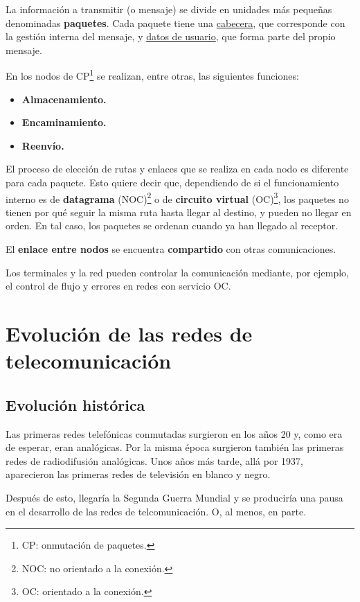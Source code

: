 \documentclass[a4paper]{book}
\begin{document}
La información a transmitir (o mensaje) se divide en unidades más pequeñas denominadas \textbf{paquetes}. Cada paquete tiene una \underline{cabecera}, que corresponde con la gestión interna del mensaje, y \underline{datos de usuario}, que forma parte del propio mensaje.

En los nodos de CP\footnote{CP: onmutación de paquetes.} se realizan, entre otras, las siguientes funciones:
\begin{itemize}
  \item \textbf{Almacenamiento.}
  \item \textbf{Encaminamiento.}
  \item \textbf{Reenvío.}
\end{itemize}

El proceso de elección de rutas y enlaces que se realiza en cada nodo es diferente para cada paquete. Esto quiere decir que, dependiendo de si el funcionamiento interno es de \textbf{datagrama} (NOC)\footnote{NOC: no orientado a la conexión.} o de \textbf{circuito virtual} (OC)\footnote{OC: orientado a la conexión.}, los paquetes no tienen por qué seguir la misma ruta hasta llegar al destino, y pueden no llegar en orden. En tal caso, los paquetes se ordenan cuando ya han llegado al receptor.

El \textbf{enlace entre nodos} se encuentra \textbf{compartido} con otras comunicaciones.

Los terminales y la red pueden controlar la comunicación mediante, por ejemplo, el control de flujo y errores en redes con servicio OC.



\section{Evolución de las redes de telecomunicación}

\subsection{Evolución histórica}
Las primeras redes telefónicas conmutadas surgieron en los años 20 y, como era de esperar, eran analógicas. Por la misma época surgieron también las primeras redes de radiodifusión analógicas. Unos años más tarde, allá por 1937, aparecieron las primeras redes de televisión en blanco y negro.

Después de esto, llegaría la Segunda Guerra Mundial y se produciría una pausa en el desarrollo de las redes de telcomunicación. O, al menos, en parte.
\end{document}
